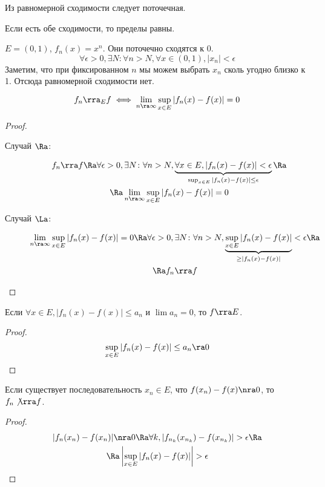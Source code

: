 \begin{Rem}
	Из равномерной сходимости следует поточечная.
\end{Rem}
\begin{Rem}
	Если есть обе сходимости, то пределы равны.
\end{Rem}

\begin{exmp}
	$E = (0, 1)$, $f_n(x) = x^n$.
	Они поточечно сходятся к $0$.
	\[ \forall \epsilon > 0, \exists N\colon \forall n > N, \forall x \in (0, 1), |x_n| < \epsilon \]
	Заметим, что при фиксированном $n$ мы можем выбрать $x_n$ сколь угодно близко к 1.
	Отсюда равномерной сходимости нет.
\end{exmp}

\begin{theorem}
	\[ f_n \rra_E f \iff \lim_{n\ra\infty} \sup_{x \in E} |f_n(x) - f(x)| = 0 \]
\end{theorem}
\begin{proof}
	\begin{description}
	\item[Случай $\Ra$:]
		\begin{gather*}
			f_n \rra f
			\Ra \forall \epsilon > 0, \exists N\colon \forall n > N, \underbrace{\forall x \in E, |f_n(x) - f(x)| < \epsilon}_{\sup_{x \in E} |f_n(x) - f(x)| \le \epsilon} \Ra \\
			\Ra \lim_{n\ra\infty} \sup_{x \in E} |f_n(x) - f(x)| = 0
		\end{gather*}

	\item[Случай $\La$:]
		\begin{gather*}
			\lim_{n\ra\infty} \sup_{x \in E} |f_n(x) - f(x)| = 0
			\Ra \forall \epsilon > 0, \exists N\colon \forall n > N, \underbrace{\sup_{x \in E} |f_n(x) - f(x)|}_{\ge |f_n(x) - f(x)|} < \epsilon \Ra \\
			\Ra f_n \rra f
		\end{gather*}
	\end{description}
\end{proof}

\begin{conseq}
	Если $\forall x \in E, |f_n(x) - f(x)| \le a_n$ и $\lim a_n = 0$, то $f \rra E$.
\end{conseq}
\begin{proof}
	\[ \sup_{x \in E} |f_n(x) - f(x)| \le a_n \ra 0 \]
\end{proof}

\begin{conseq}
	Если существует последовательность $x_n \in E$, что $f(x_n) - f(x) \nra 0$, то $f_n \not\rra f$.
\end{conseq}
\begin{proof}
	\begin{gather*}
		|f_n(x_n) - f(x_n)| \nra 0
		\Ra \forall k, |f_{n_k}(x_{n_k}) - f(x_{n_k})| > \epsilon \Ra \\
		\Ra \left| \sup_{x \in E} |f_n(x) - f(x)| \right| > \epsilon
	\end{gather*}
\end{proof}

